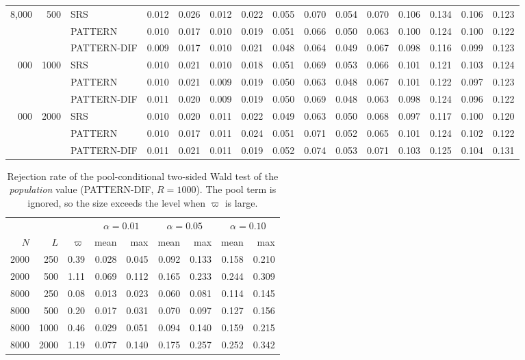 \documentclass[pdflatex,sn-mathphys-num,iicol]{sn-jnl}
\theoremstyle{thmstyleone}
\theoremstyle{thmstyletwo}
\theoremstyle{thmstylethree}
\begin{document}
\begin{table}[t]
{\begin{tabular}{rrl rr rr rr rr rr rr }
8{,}000 & 500 & SRS & 0.012 & 0.026 & 0.012 & 0.022 & 0.055 & 0.070 & 0.054 & 0.070 & 0.106 & 0.134 & 0.106 & 0.123 \\
 &  & PATTERN & 0.010 & 0.017 & 0.010 & 0.019 & 0.051 & 0.066 & 0.050 & 0.063 & 0.100 & 0.124 & 0.100 & 0.122 \\
 &  & PATTERN-DIF & 0.009 & 0.017 & 0.010 & 0.021 & 0.048 & 0.064 & 0.049 & 0.067 & 0.098 & 0.116 & 0.099 & 0.123 \\
\addlinespace
8{,}000 & 1000 & SRS & 0.010 & 0.021 & 0.010 & 0.018 & 0.051 & 0.069 & 0.053 & 0.066 & 0.101 & 0.121 & 0.103 & 0.124 \\
 &  & PATTERN & 0.010 & 0.021 & 0.009 & 0.019 & 0.050 & 0.063 & 0.048 & 0.067 & 0.101 & 0.122 & 0.097 & 0.123 \\
 &  & PATTERN-DIF & 0.011 & 0.020 & 0.009 & 0.019 & 0.050 & 0.069 & 0.048 & 0.063 & 0.098 & 0.124 & 0.096 & 0.122 \\
\addlinespace
8{,}000 & 2000 & SRS & 0.010 & 0.020 & 0.011 & 0.022 & 0.049 & 0.063 & 0.050 & 0.068 & 0.097 & 0.117 & 0.100 & 0.120 \\
 &  & PATTERN & 0.010 & 0.017 & 0.011 & 0.024 & 0.051 & 0.071 & 0.052 & 0.065 & 0.101 & 0.124 & 0.102 & 0.122 \\
 &  & PATTERN-DIF & 0.011 & 0.021 & 0.011 & 0.019 & 0.052 & 0.074 & 0.053 & 0.071 & 0.103 & 0.125 & 0.104 & 0.131 \\
\bottomrule\end{tabular}}

\end{table}

\begin{table}[t]
\centering\footnotesize
\caption{Rejection rate of the pool-conditional two-sided Wald test of the \emph{population} value (PATTERN-DIF, $R=1000$). The pool term is ignored, so the size exceeds the level when $\varpi$ is large.}\label{tab:test-size-popdesign}
\begin{tabular}{rr r rr rr rr}\toprule
 & & & \multicolumn{2}{c}{$\alpha=0.01$} & \multicolumn{2}{c}{$\alpha=0.05$} & \multicolumn{2}{c}{$\alpha=0.10$} \\
$N$ & $L$ & $\varpi$ & mean & max & mean & max & mean & max \\\midrule
2000 & 250 & 0.39 & 0.028 & 0.045 & 0.092 & 0.133 & 0.158 & 0.210 \\
2000 & 500 & 1.11 & 0.069 & 0.112 & 0.165 & 0.233 & 0.244 & 0.309 \\
8000 & 250 & 0.08 & 0.013 & 0.023 & 0.060 & 0.081 & 0.114 & 0.145 \\
8000 & 500 & 0.20 & 0.017 & 0.031 & 0.070 & 0.097 & 0.127 & 0.156 \\
8000 & 1000 & 0.46 & 0.029 & 0.051 & 0.094 & 0.140 & 0.159 & 0.215 \\
8000 & 2000 & 1.19 & 0.077 & 0.140 & 0.175 & 0.257 & 0.252 & 0.342 \\
\bottomrule\end{tabular}

\end{table}
\end{document}
